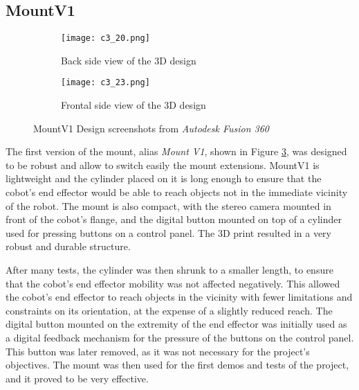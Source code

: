 \subsection{MountV1}

\begin{figure}
    \centering
    \begin{subfigure}{\textwidth}
        \texttt{[image: c3\_20.png]} %
        \caption{Back side view of the 3D design}
        \label{fig:frontv1}
    \end{subfigure}
    
    \vspace{1em} %

    \begin{subfigure}{\textwidth}
        \texttt{[image: c3\_23.png]} %
        \caption{Frontal side view of the 3D design}
        \label{fig:sidev1}
    \end{subfigure}

    \caption{MountV1 Design screenshots from \textit{Autodesk Fusion 360}}
    \label{fig:mountv1}
\end{figure}

The first version of the mount, alias \textit{Mount V1}, shown in Figure \ref{fig:mountv1},
was designed to be robust and allow to switch easily the mount extensions. 
MountV1 is lightweight and the cylinder placed on it is long enough to ensure that the cobot's end effector
would be able to reach objects not in the immediate vicinity of the robot. The mount is also
compact, with the stereo camera mounted in front of the cobot's flange, and the digital button mounted on top
of a cylinder used for pressing buttons on a control panel. The 3D print resulted in a very robust and durable
structure.

After many tests, the cylinder was then shrunk to a smaller length, to ensure that the cobot's end effector
mobility was not affected negatively. This allowed the cobot's end effector to reach objects
in the vicinity with fewer limitations and constraints on its orientation, at the expense of a slightly reduced reach.
The digital button mounted on the extremity of the end effector
was initially used as a digital feedback mechanism for the pressure
of the buttons on the control panel. This button was later removed, as it was not necessary for the project's
objectives. The mount was then used for the first demos and tests of the project, and it proved to be very effective.


